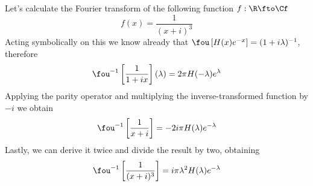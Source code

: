 \documentclass[../mmf.tex]{subfiles}
\begin{document}
\begin{eg}
	Let's calculate the Fourier transform of the following function $f:\R\fto\Cf$
	\begin{equation*}
		f(x)=\frac{1}{(x+i)^3}
	\end{equation*}
	Acting symbolically on this we know already that $\fou\left[ H(x)e^{-x} \right]=(1+i\lambda)^{-1}$, therefore
	\begin{equation*}
		\fou^{-1}\left[ \frac{1}{1+ix} \right](\lambda)=2\pi H(-\lambda)e^{\lambda}
	\end{equation*}
	Applying the parity operator and multiplying the inverse-transformed function by $-i$ we obtain
	\begin{equation*}
		\fou^{-1}\left[ \frac{1}{x+i} \right]=-2i\pi H(\lambda)e^{-\lambda}
	\end{equation*}
	Lastly, we can derive it twice and divide the result by two, obtaining
	\begin{equation*}
		\fou^{-1}\left[ \frac{1}{(x+i)^3} \right]=i\pi\lambda^2H(\lambda)e^{-\lambda}
	\end{equation*}
\end{eg}
\end{document}
